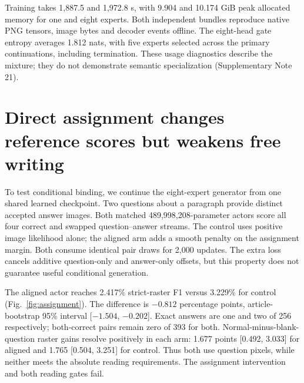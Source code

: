 Training takes 1,887.5 and 1,972.8 s, with 9.904 and 10.174 GiB peak allocated
memory for one and eight experts. Both independent bundles reproduce native
PNG tensors, image bytes and decoder events offline. The eight-head gate
entropy averages 1.812 nats, with five experts selected across the primary
continuations, including termination. These usage diagnostics describe the
mixture; they do not demonstrate semantic specialization (Supplementary
Note 21).


\section*{Direct assignment changes reference scores but weakens free writing}
To test conditional binding, we continue the eight-expert generator from one
shared learned checkpoint. Two questions about a paragraph provide distinct
accepted answer images. Both matched 489,998,208-parameter actors score all
four correct and swapped question--answer streams. The control uses positive
image likelihood alone; the aligned arm adds a smooth penalty on the
assignment margin. Both consume identical pair draws for 2,000 updates.
The extra loss cancels additive question-only and answer-only offsets, but
this property does not guarantee useful conditional generation.

The aligned actor reaches 2.417\% strict-raster F1 versus 3.229\% for control
(Fig.~\ref{fig:assignment}). The difference is $-0.812$ percentage points,
article-bootstrap 95\% interval [$-1.504$, $-0.202$]. Exact answers are one
and two of 256 respectively; both-correct pairs remain zero of 393 for both.
Normal-minus-blank-question raster gains resolve positively in each arm:
1.677 points [0.492, 3.033] for aligned and 1.765 [0.504, 3.251] for control.
Thus both use question pixels, while neither meets the absolute reading
requirements. The assignment intervention and both reading gates fail.

